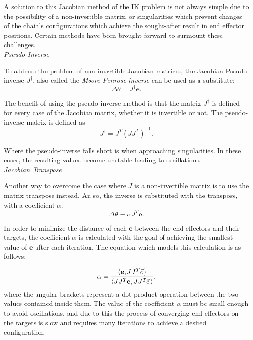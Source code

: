 A solution to this Jacobian method of the IK problem is not always simple due to
the possibility of a non-invertible matrix, or singularities which prevent
changes of the chain's configurations which achieve the sought-after result in
end effector positions. Certain methods have been brought forward to surmount
these challenges. \\

\noindent\textit{Pseudo-Inverse}

To address the problem of non-invertible Jacobian matrices, the Jacobian
Pseudo-inverse \(J^\dagger\), also called the \textit{Moore-Penrose inverse}
\cite{golub_matrix3} can be used as
a substitute:
\begin{equation}
    \Delta \theta = J^{\dagger}\mathbf{e}.
\end{equation}

The benefit of using the pseudo-inverse method is that the matrix \(J^\dagger\)
is defined for every case of the Jacobian matrix, whether it is invertible or
not. The pseudo-inverse matrix is defined as
\begin{equation}
    J^\dagger = J^T (J J^T)^{-1}.
\end{equation}

Where the pseudo-inverse falls short is when approaching singularities. In these
cases, the resulting values become unstable leading to oscillations. \\

\noindent\textit{Jacobian Transpose}

Another way to overcome the case where \(J\) is a non-invertible matrix is to
use the matrix transpose instead. An so, the inverse is substituted with the
transpose, with a coefficient \(\alpha\):
\begin{equation}
    \Delta \theta = \alpha J^T \mathbf{e}.
\end{equation}

In order to minimize the distance of each \(\mathbf{e}\) between  the end effectors and
their targets, the coefficient \(\alpha\) is calculated with the goal of
achieving the smallest value of \(\mathbf{e}\) after each iteration. The equation
which models this calculation is as follows:

\begin{equation}
    \alpha = \frac
        {
            \langle\mathbf{e}, J J^T \pvec{e}\rangle
        }
        {
            \langle J J^T \mathbf{e},J J^T \pvec{e} \rangle
        },
\end{equation}
where the angular brackets represent a dot product operation between the two
values contained inside them. The value of the coefficient \(\alpha\) must be
small enough to avoid oscillations, and due to this the process of converging
end effectors on the targets is slow and requires many iterations to achieve
a desired configuration. \\

